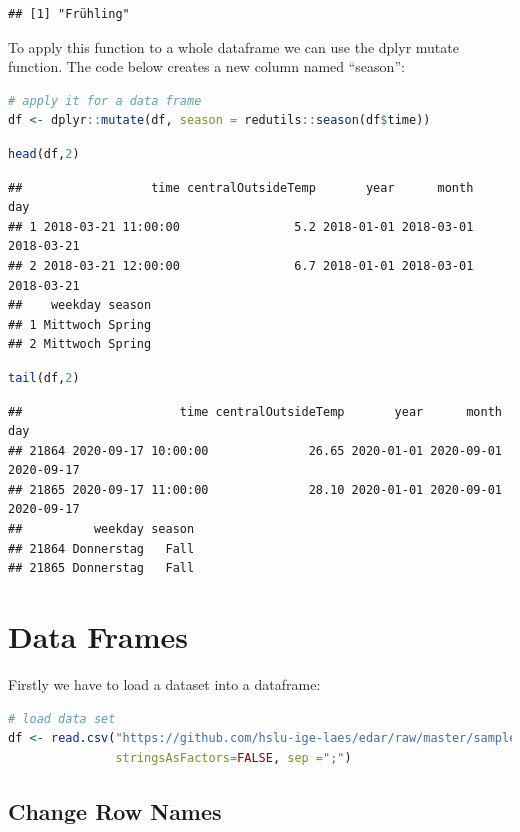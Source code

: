 \documentclass[
]{book}
\begin{document}
\begin{lstlisting}
## [1] "Frühling"
\end{lstlisting}

To apply this function to a whole dataframe we can use the dplyr mutate function. The code below creates a new column named ``season'':

\begin{lstlisting}[language=R]
# apply it for a data frame
df <- dplyr::mutate(df, season = redutils::season(df$time))
\end{lstlisting}

\begin{lstlisting}[language=R]
head(df,2)
\end{lstlisting}

\begin{lstlisting}
##                  time centralOutsideTemp       year      month        day
## 1 2018-03-21 11:00:00                5.2 2018-01-01 2018-03-01 2018-03-21
## 2 2018-03-21 12:00:00                6.7 2018-01-01 2018-03-01 2018-03-21
##    weekday season
## 1 Mittwoch Spring
## 2 Mittwoch Spring
\end{lstlisting}

\begin{lstlisting}[language=R]
tail(df,2)
\end{lstlisting}

\begin{lstlisting}
##                      time centralOutsideTemp       year      month        day
## 21864 2020-09-17 10:00:00              26.65 2020-01-01 2020-09-01 2020-09-17
## 21865 2020-09-17 11:00:00              28.10 2020-01-01 2020-09-01 2020-09-17
##          weekday season
## 21864 Donnerstag   Fall
## 21865 Donnerstag   Fall
\end{lstlisting}

\hypertarget{data-frames}{%
\section{Data Frames}\label{data-frames}}

Firstly we have to load a dataset into a dataframe:

\begin{lstlisting}[language=R]
# load data set
df <- read.csv("https://github.com/hslu-ige-laes/edar/raw/master/sampleData/flatTempHum.csv",
               stringsAsFactors=FALSE, sep =";")
\end{lstlisting}

\hypertarget{change-row-names}{%
\subsection{Change Row Names}\label{change-row-names}}
\end{document}
